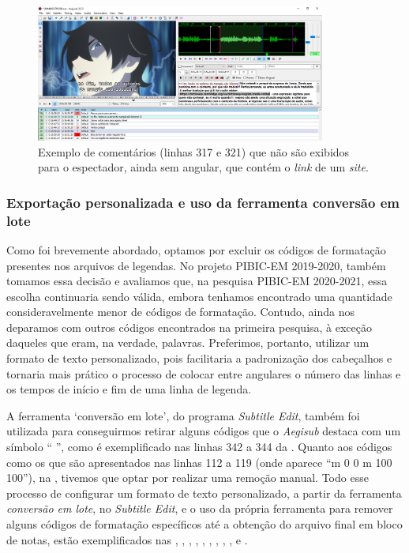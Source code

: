 \documentclass[portuguese]{textolivre}
\newlength\myheight
\newlength\mydepth
\newcommand*\inlinegraphics[1]{%
  \settototalheight\myheight{Xygp}%
  \settodepth\mydepth{Xygp}%
  \raisebox{-\mydepth}{\texttt{[image: \#1]}}%
}
\begin{document}
\begin{figure}[htbp]
 \centering
 \includegraphics[width=0.85\textwidth]{Fig16.png}
 \caption{Exemplo de comentários (linhas 317 e 321) que não são exibidos para o espectador, ainda sem angular, que contém o \textit{link} de um \textit{site}.}
 \label{fig16}
\end{figure}

\subsubsection{Exportação personalizada e uso da ferramenta conversão em lote}\label{sec-autores}
Como foi brevemente abordado, optamos por excluir os códigos de formatação presentes nos arquivos de legendas. No projeto PIBIC-EM 2019-2020, também tomamos essa decisão e avaliamos que, na pesquisa PIBIC-EM 2020-2021, essa escolha continuaria sendo válida, embora tenhamos encontrado uma quantidade consideravelmente menor de códigos de formatação. Contudo, ainda nos deparamos com outros códigos encontrados na primeira pesquisa, à exceção daqueles que eram, na verdade, palavras. Preferimos, portanto, utilizar um formato de texto personalizado, pois facilitaria a padronização dos cabeçalhos e tornaria mais prático o processo de colocar entre angulares o número das linhas e os tempos de início e fim de uma linha de legenda.

A ferramenta ‘conversão em lote’, do programa \textit{Subtitle Edit}, também foi utilizada para conseguirmos retirar alguns códigos que o \textit{Aegisub} destaca com um símbolo “\inlinegraphics{simbolo.png}”, como é exemplificado nas linhas 342 a 344 da . Quanto aos códigos como os que são apresentados nas linhas 112 a 119 (onde aparece “m 0 0 m 100 100”), na , tivemos que optar por realizar uma remoção manual. Todo esse processo de configurar um formato de texto personalizado, a partir da ferramenta \textit{conversão em lote}, no \textit{Subtitle Edit}, e o uso da própria ferramenta para remover alguns códigos de formatação específicos até a obtenção do arquivo final em bloco de notas, estão exemplificados nas , , , , , , , , ,  e .
\end{document}
